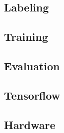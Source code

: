 \subsection{Labeling}
\subsection{Training}
\subsection{Evaluation}


\subsection{Tensorflow}

\subsection{Hardware}
